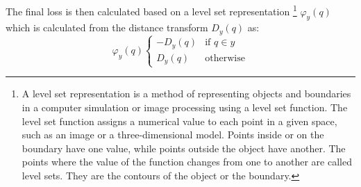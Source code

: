 The final loss is then calculated based on a level set representation \footnote{A level set representation is a method of representing objects and boundaries in a computer simulation or image processing using a level set function. The level set function assigns a numerical value to each point in a given space, such as an image or a three-dimensional model. Points inside or on the boundary have one value, while points outside the object have another. The points where the value of the function changes from one to another are called level sets. They are the contours of the object or the boundary.} $\varphi_y(q)$ which is calculated from the distance transform $D_y(q)$ as:
\begin{equation}
    \varphi_y(q)
    \begin{cases}
        -D_y(q) & \text{if }q\in y \\
        D_y(q)  & \text{otherwise}
    \end{cases}
    \label{eqn:varphi}
\end{equation}


